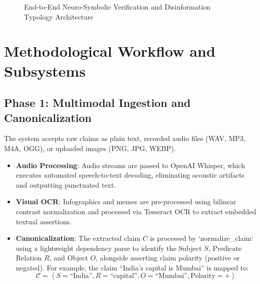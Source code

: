 \documentclass[12pt,a4paper]{report}
\begin{document}
\begin{figure}[h!]
\caption{End-to-End Neuro-Symbolic Verification and Disinformation Typology Architecture}
\label{fig:system_architecture}
\end{figure}

\section{Methodological Workflow and Subsystems}

\subsection{Phase 1: Multimodal Ingestion and Canonicalization}
The system accepts raw claims as plain text, recorded audio files (WAV, MP3, M4A, OGG), or uploaded images (PNG, JPG, WEBP). 
\begin{itemize}
    \item \textbf{Audio Processing}: Audio streams are passed to OpenAI Whisper, which executes automated speech-to-text decoding, eliminating acoustic artifacts and outputting punctuated text.
    \item \textbf{Visual OCR}: Infographics and memes are pre-processed using bilinear contrast normalization and processed via Tesseract OCR to extract embedded textual assertions.
    \item \textbf{Canonicalization}: The extracted claim $C$ is processed by `normalize\_claim` using a lightweight dependency parse to identify the Subject $S$, Predicate Relation $R$, and Object $O$, alongside asserting claim polarity (positive or negated). For example, the claim ``India's capital is Mumbai'' is mapped to:
    \[
    \mathcal{C} = \left\langle S = \text{``India''}, R = \text{``capital''}, O = \text{``Mumbai''}, \text{Polarity} = + \right\rangle
    \]
\end{itemize}
\end{document}
